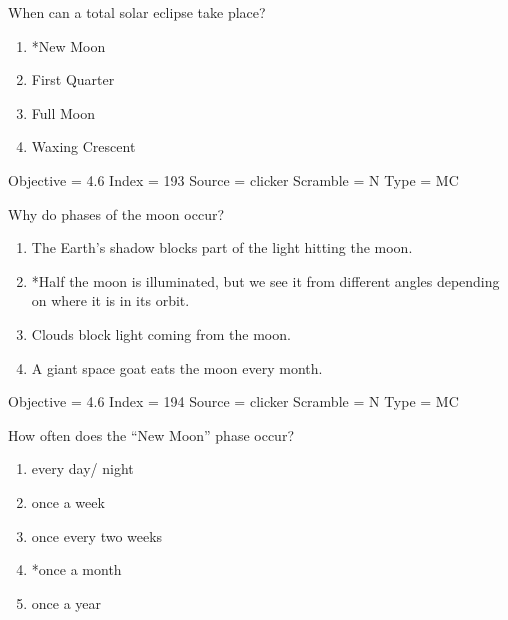 \documentclass[11pt]{article}
\begin{document}
\begin{enumerate}
\begin{minipage}{\textwidth}
\begin{minipage}{\textwidth}
\item When can a total solar eclipse take place?
\begin{multicols}{3}
\begin{enumerate} 
\setlength{\itemsep}{1pt} 
\setlength{\parskip}{0pt} 
\setlength{\parsep}{0pt}
\setlength{\multicolsep}{1pt} 
\item *New Moon
\item First Quarter
\item Full Moon
\item Waxing Crescent
\end{enumerate} 
\vfill 
\end{multicols}

Objective = 4.6
Index = 193
Source = clicker
Scramble = N
Type = MC
\end{minipage}
\end{minipage}
\vskip 0.20in

\begin{minipage}{\textwidth}
\begin{minipage}{\textwidth}
\item Why do phases of the moon occur?
\begin{enumerate} 
\setlength{\itemsep}{1pt} 
\setlength{\parskip}{0pt} 
\setlength{\parsep}{0pt}
\setlength{\multicolsep}{1pt} 
\item The Earth’s shadow blocks part of the light hitting the moon.
\item *Half the moon is illuminated, but we see it from different angles depending on where it is in its orbit.
\item Clouds block light coming from the moon.
\item A giant space goat eats the moon every month.
\end{enumerate} 
Objective = 4.6
Index = 194
Source = clicker
Scramble = N
Type = MC
\end{minipage}
\end{minipage}
\vskip 0.20in

\begin{minipage}{\textwidth}
\begin{minipage}{\textwidth}
\item How often does the “New Moon” phase occur?
\begin{multicols}{2}
\begin{enumerate} 
\setlength{\itemsep}{1pt} 
\setlength{\parskip}{0pt} 
\setlength{\parsep}{0pt}
\setlength{\multicolsep}{1pt} 
\item every day/ night
\item once a week
\item once every two weeks
\item *once a month
\item once a year
\end{enumerate} 
\vfill 
\end{multicols}


\end{minipage}
\end{minipage}
\end{enumerate}
\end{document}
